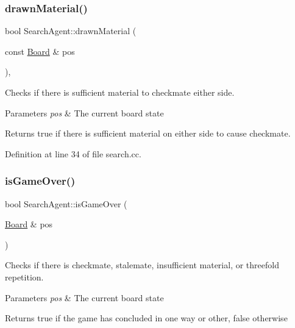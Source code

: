 \subsubsection{\texorpdfstring{drawn\+Material()}{drawnMaterial()}}
{\footnotesize\ttfamily bool Search\+Agent\+::drawn\+Material (\begin{DoxyParamCaption}\item[{const \mbox{\hyperlink{classBoard}{Board}} \&}]{pos }\end{DoxyParamCaption})\hspace{0.3cm}{\ttfamily [private]}, {\ttfamily [noexcept]}}



Checks if there is sufficient material to checkmate either side. 


\begin{DoxyParams}{Parameters}
{\em pos} & The current board state \\
\hline
\end{DoxyParams}
\begin{DoxyReturn}{Returns}
true if there is sufficient material on either side to cause checkmate. 
\end{DoxyReturn}


Definition at line 34 of file search.\+cc.

\mbox{\label{classSearchAgent_ae345af56fed112c0c826653c07e2cd99}} 
\subsubsection{\texorpdfstring{is\+Game\+Over()}{isGameOver()}}
{\footnotesize\ttfamily bool Search\+Agent\+::is\+Game\+Over (\begin{DoxyParamCaption}\item[{\mbox{\hyperlink{classBoard}{Board}} \&}]{pos }\end{DoxyParamCaption})\hspace{0.3cm}{\ttfamily [noexcept]}}



Checks if there is checkmate, stalemate, insufficient material, or threefold repetition. ~\newline
 


\begin{DoxyParams}{Parameters}
{\em pos} & The current board state \\
\hline
\end{DoxyParams}
\begin{DoxyReturn}{Returns}
true if the game has concluded in one way or other, false otherwise 
\end{DoxyReturn}


